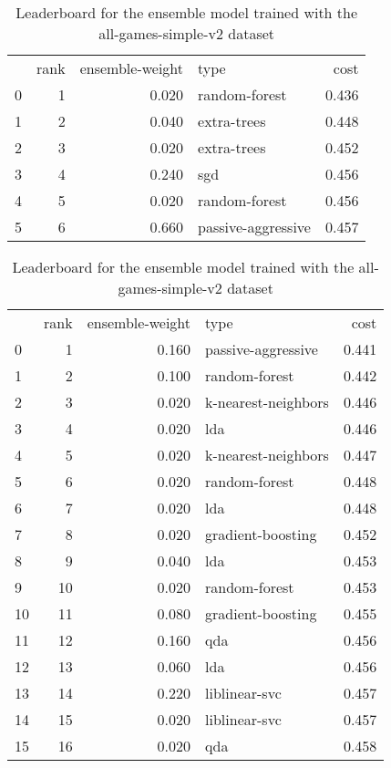 \begin{table}[]
	\centering
	\begin{tabular}{lrrlr}
		  & rank & ensemble-weight & type               & cost  \\
		0 & 1    & 0.020           & random-forest      & 0.436 \\
		1 & 2    & 0.040           & extra-trees        & 0.448 \\
		2 & 3    & 0.020           & extra-trees        & 0.452 \\
		3 & 4    & 0.240           & sgd                & 0.456 \\
		4 & 5    & 0.020           & random-forest      & 0.456 \\
		5 & 6    & 0.660           & passive-aggressive & 0.457 \\
	\end{tabular}

	\caption{Leaderboard for the ensemble model trained with the all-games-simple-v2 dataset}
	\label{tab:lb-all-games-simple-v2-autoencode}
\end{table}

\begin{table}[]
	\centering
	\begin{tabular}{lrrlr}
		   & rank & ensemble-weight & type                & cost  \\
		0  & 1    & 0.160           & passive-aggressive  & 0.441 \\
		1  & 2    & 0.100           & random-forest       & 0.442 \\
		2  & 3    & 0.020           & k-nearest-neighbors & 0.446 \\
		3  & 4    & 0.020           & lda                 & 0.446 \\
		4  & 5    & 0.020           & k-nearest-neighbors & 0.447 \\
		5  & 6    & 0.020           & random-forest       & 0.448 \\
		6  & 7    & 0.020           & lda                 & 0.448 \\
		7  & 8    & 0.020           & gradient-boosting   & 0.452 \\
		8  & 9    & 0.040           & lda                 & 0.453 \\
		9  & 10   & 0.020           & random-forest       & 0.453 \\
		10 & 11   & 0.080           & gradient-boosting   & 0.455 \\
		11 & 12   & 0.160           & qda                 & 0.456 \\
		12 & 13   & 0.060           & lda                 & 0.456 \\
		13 & 14   & 0.220           & liblinear-svc       & 0.457 \\
		14 & 15   & 0.020           & liblinear-svc       & 0.457 \\
		15 & 16   & 0.020           & qda                 & 0.458 \\
	\end{tabular}

	\caption{Leaderboard for the ensemble model trained with the all-games-simple-v2 dataset}
	\label{tab:lb-all-games-simple-v2-randsplit}
\end{table}

